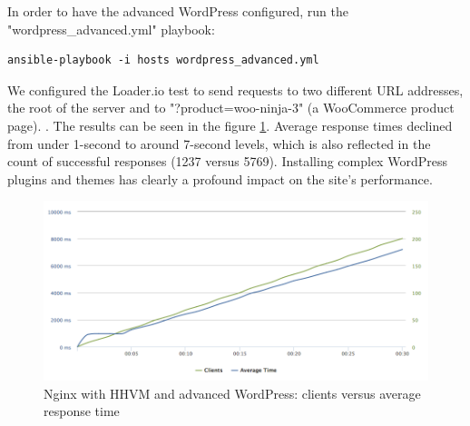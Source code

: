 In order to have the advanced WordPress configured, run the "wordpress\_advanced.yml" playbook:

\begin{lstlisting}
ansible-playbook -i hosts wordpress_advanced.yml
\end{lstlisting}

We configured the Loader.io test to send requests to two different URL addresses, the root of the server and to "?product=woo-ninja-3" (a WooCommerce product page). \cite{Loader.io:nginx_hhvm_wp-advanced}. The results can be seen in the figure \ref{fig:nginx_hhvm_wp-advanced}. Average response times declined from under 1-second to around 7-second levels, which is also reflected in the count of successful responses (1237 versus 5769). Installing complex WordPress plugins and themes has clearly a profound impact on the site's performance.

\begin{figure}[H]
\begin{center}
\includegraphics[scale=0.5]{figures/Nginx_HHVM_WP-advanced.png}
\caption{Nginx with HHVM and advanced WordPress: clients versus average response time}
\label{fig:nginx_hhvm_wp-advanced}
\end{center}
\end{figure}
